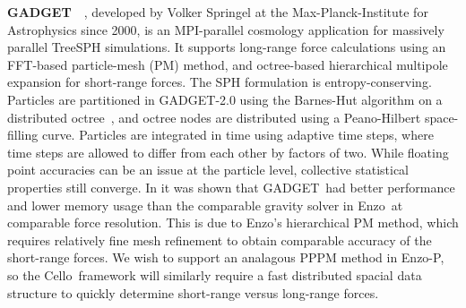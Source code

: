 \documentclass[11pt,letterpaper]{article}
\newcommand{\cello}{\textsf{Cello}}
\newcommand{\enzo}{\textsf{Enzo}}
\newcommand{\enzoii}{\textsf{Enzo-P}}
\newcommand{\gadget}{\textsf{GADGET}}
\begin{document}
\textbf{\gadget}~\cite{wwwgadget}~\cite{Sp05}, developed by Volker
Springel at the Max-Planck-Institute for Astrophysics since 2000, is
an MPI-parallel cosmology application for massively parallel TreeSPH
simulations.  It supports long-range force calculations using an
FFT-based particle-mesh (PM) method, and octree-based hierarchical
multipole expansion for short-range forces.  The SPH formulation is
entropy-conserving.
%
Particles are partitioned in \gadget-2.0 using the Barnes-Hut
algorithm on a distributed octree~\cite{BaHu86}, and octree nodes are
distributed using a Peano-Hilbert space-filling curve.  Particles are
integrated in time using adaptive time steps, where time steps are
allowed to differ from each other by factors of two.
%
While floating point accuracies can be an issue at the particle level,
collective statistical properties still converge.  In \cite{OsNa05} it
was shown that \gadget\ had better performance and lower memory usage
than the comparable gravity solver in \enzo\ at comparable force
resolution.  This is due to \enzo's hierarchical PM method, which
requires relatively fine mesh refinement to obtain comparable accuracy
of the short-range forces.
%
We wish to support an analagous PPPM method in \enzoii, so the \cello\
framework will similarly require a fast distributed spacial data
structure to quickly determine short-range versus long-range forces.
\end{document}

